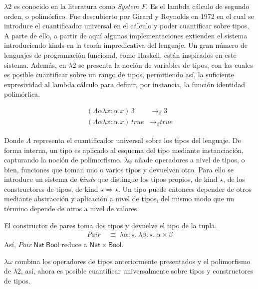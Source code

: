 $\lambda2$ es conocido en la literatura como \textit{System F}. Es el lambda cálculo de segundo orden, o polimórfico. Fue descubierto por Girard y Reynolds en 1972 en el cual se introduce el cuantificador universal en el cálculo y poder cuantificar sobre tipos. A parte de ello, a partir de aquí algunas implementaciones extienden el sistema introduciendo kinds en la teoría impredicativa del lenguaje. Un gran número de lenguajes de programación funcional, como Haskell, están inspirados en este sistema. Además, en $\lambda2$ se presenta la noción de variables de tipos, con las cuales es posible cuantificar sobre un rango de tipos, permitiendo así, la suficiente expresividad al lambda cálculo para definir, por instancia, la función identidad polimórfica.

\begin{example}
\begin{align*}
(\Lambda\alpha \lambda x : \alpha . x)\,3  &\longrightarrow_\beta 3 \\
(\Lambda\alpha \lambda x : \alpha . x)\,\textit{true} &\longrightarrow_\beta \textit{true}
\end{align*}
\end{example}
Donde $\Lambda$ representa el cuantificador universal sobre los tipos del lenguaje. De forma interna, un tipo es aplicado al esquema del tipo mediante instanciación, capturando la noción de polimorfismo.
\newline
\newline
$\lambda\underline{\omega}$ añade operadores a nivel de tipos, o bien, funciones que toman uno o varios tipos y devuelven otro. Para ello se introduce un sistema de \textit{kinds} que distingue los tipos propios, de kind $\star$, de los constructores de tipos, de kind $\star \Rightarrow \star$. Un tipo puede entonces
depender de otros mediante abstracción y aplicación a nivel de
tipos, del mismo modo que un término depende de otros a nivel de valores.

\begin{example}
  El constructor de pares toma dos tipos y devuelve el tipo de la tupla.
  \begin{align*}
    \mathit{Pair} &\;\equiv\; \lambda \alpha : \star.\ \lambda \beta : \star.\
    \alpha \times \beta
  \end{align*}
  Así, $\mathit{Pair}\ \mathsf{Nat}\ \mathsf{Bool}$ reduce a $\mathsf{Nat}
  \times \mathsf{Bool}$.
\end{example}

$\lambda\omega$ combina los operadores de tipos anteriormente presentados y el polimorfismo de $\lambda2$, así, ahora es posible cuantificar universalmente sobre tipos y constructores de tipos.


